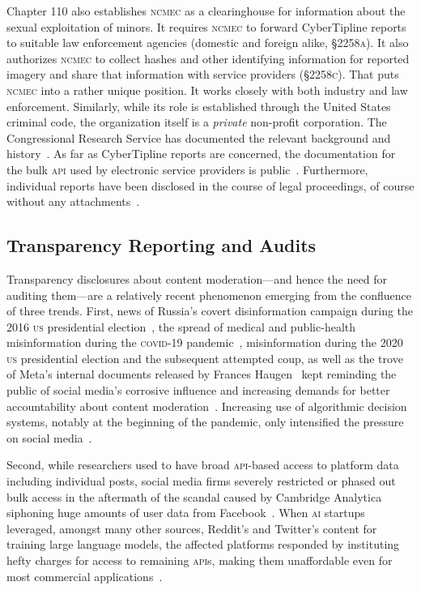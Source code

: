 \documentclass[nonacm,screen]{acmart}
\newcommand\V[1]{\textsc{\MakeLowercase{#1}}}
\begin{document}
Chapter 110 also establishes \V{NCMEC} as a clearinghouse for information about
the sexual exploitation of minors. It requires \V{NCMEC} to forward CyberTipline
reports to suitable law enforcement agencies (domestic and foreign alike,
\V{\S2258A}). It also authorizes \V{NCMEC} to collect hashes and other
identifying information for reported imagery and share that information with
service providers (\V{\S2258C}). That puts \V{NCMEC} into a rather unique
position. It works closely with both industry and law enforcement. Similarly,
while its role is established through the United States criminal code, the
organization itself is a \emph{private} non-profit corporation. The
Congressional Research Service has documented the relevant background and
history~\cite{FernandesAlcantaraHanson2021}. As far as CyberTipline reports are
concerned, the documentation for the bulk \V{API} used by electronic service
providers is public~\cite{NCMEC2024}. Furthermore, individual reports have been
disclosed in the course of legal proceedings, of course without any
attachments~\cite{NationalCenterForMissingAndExploitedChildren2017,
NationalCenterForMissingAndExploitedChildren2017a}.


\subsection{Transparency Reporting and Audits}

Transparency disclosures about content moderation---and hence the need for
auditing them---are a relatively recent phenomenon emerging from the confluence
of three trends. First, news of Russia's covert disinformation campaign during
the 2016 \V{US} presidential election~\cite{Francoisdouek2021}, the spread of
medical and public-health misinformation during the \V{COVID-19}
pandemic~\cite{ChoLiea2023,FoleyGurakar2022,GreenhalghOzbilginea2022},
misinformation during the 2020 \V{US} presidential election and the subsequent
attempted coup, as well as the trove of Meta's internal documents released by
Frances Haugen~\cite{CameronWodinskyea2023,ElliottChristopherea2021} kept
reminding the public of social media's corrosive influence and increasing
demands for better accountability about content
moderation~\cite{HaimsonDelmonacoea2021,KozyrevaHerzogea2023}. Increasing use of
algorithmic decision systems, notably at the beginning of the pandemic, only
intensified the pressure on social media~\cite{ScottKayali2020}.

Second, while researchers used to have broad \V{API}-based access to platform
data including individual posts, social media firms severely restricted or
phased out bulk access in the aftermath of the scandal caused by Cambridge
Analytica siphoning huge amounts of user data from
Facebook~\cite{Bruns2019,Puschmann2019,WalkerMerceaea2019}. When \V{AI} startups
leveraged, amongst many other sources, Reddit's and Twitter's content for
training large language models, the affected platforms responded by instituting
hefty charges for access to remaining \V{API}s, making them unaffordable even
for most commercial applications~\cite{Isaac2023}.
\end{document}
